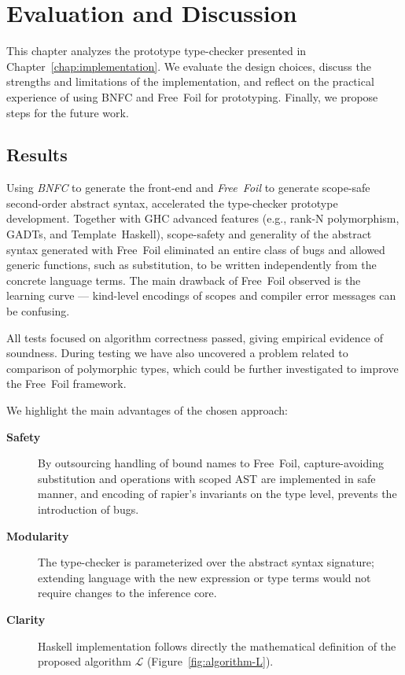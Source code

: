 \chapter{Evaluation and Discussion}
\label{chap:evaluation}

This chapter analyzes the prototype type-checker presented in Chapter~\ref{chap:implementation}. We evaluate the design choices, discuss the strengths and limitations of the implementation, and reflect on the practical experience of using BNFC and Free~Foil for prototyping. Finally, we propose steps for the future work.

\section{Results}

Using \emph{BNFC} to generate the front-end and \emph{Free~Foil} to generate scope-safe second-order abstract syntax, accelerated the type-checker prototype development. Together with GHC advanced features (e.g., rank-N polymorphism, GADTs, and Template~Haskell), scope-safety and generality of the abstract syntax generated with Free~Foil eliminated an entire class of bugs and allowed generic functions, such as substitution, to be written independently from the concrete language terms. The main drawback of Free~Foil observed is the learning curve — kind-level encodings of scopes and compiler error messages can be confusing.

All tests focused on algorithm correctness passed, giving empirical evidence of soundness. During testing we have also uncovered a problem related to comparison of polymorphic types, which could be further investigated to improve the Free~Foil framework.

We highlight the main advantages of the chosen approach:

\begin{description}
  \item[\textbf{Safety}] By outsourcing handling of bound names to Free~Foil, capture-avoiding substitution and operations with scoped AST are implemented in safe manner, and encoding of rapier's invariants on the type level, prevents the introduction of bugs.
  \item[\textbf{Modularity}] The type-checker is parameterized over the abstract syntax signature; extending language with the new expression or type terms would not require changes to the inference core.
  \item[\textbf{Clarity}] Haskell implementation follows directly the mathematical definition of the proposed algorithm $\mathcal{L}$ (Figure~\ref{fig:algorithm-L}).
\end{description}

